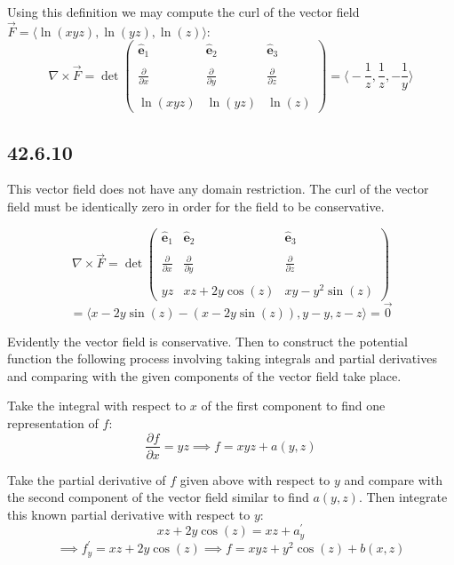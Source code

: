 \documentclass{article}
\begin{document}
Using this definition we may compute the curl of the vector field $\vec{F} = \langle \ln(xyz), \ln(yz),\ln(z) \rangle$:
$$\nabla \times \vec{F} = \det \begin{pmatrix}
    \hat{\mathbf{e}}_1 & \hat{\mathbf{e}}_2 & \hat{\mathbf{e}}_3 \\
    \\
    \frac{\partial}{\partial x} & \frac{\partial}{\partial y} & \frac{\partial}{\partial z} \\
    \\
    \ln(xyz) & \ln(yz) & \ln(z)
\end{pmatrix} = \bigg\langle -\frac{1}{z}, \frac{1}{z} ,-\frac{1}{y} \bigg\rangle$$

\subsection{42.6.10}

This vector field does not have any domain restriction. The curl of the vector field must be identically zero in order for the field to be conservative.

$$\nabla \times \vec{F} = \det \begin{pmatrix}
    \hat{\mathbf{e}}_1 & \hat{\mathbf{e}}_2 & \hat{\mathbf{e}}_3 \\
    \\
    \frac{\partial}{\partial x} & \frac{\partial}{\partial y} & \frac{\partial}{\partial z} \\
    \\
    yz & xz+2y\cos(z) & xy-y^2\sin(z)
\end{pmatrix}$$
$$ = \langle x-2y\sin(z) - (x-2y\sin(z)), y-y ,z-z \rangle = \vec{0}$$

Evidently the vector field is conservative. Then to construct the potential function the following process involving taking integrals and partial derivatives and comparing with the given components of the vector field take place.

Take the integral with respect to $x$ of the first component to find one representation of $f$:
$$\frac{\partial f}{\partial x} = yz \implies f = xyz + a(y,z)$$

Take the partial derivative of $f$ given above with respect to $y$ and compare with the second component of the vector field similar to find $a(y,z)$. Then integrate this known partial derivative with respect to $y$:
$$xz + 2y\cos(z) = xz + a^{\prime}_y$$
$$ \implies f^{\prime}_y = xz + 2y\cos(z) \implies f = xyz + y^2\cos(z) + b(x,z)$$
\end{document}
